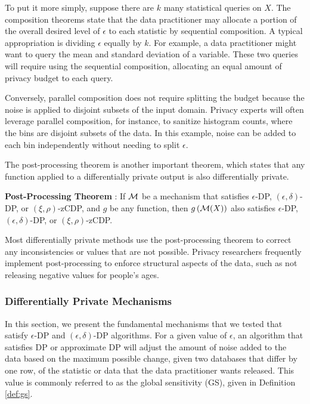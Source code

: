 To put it more simply, suppose there are $k$ many statistical queries on $X$. The composition theorems state that the data practitioner may allocate a portion of the overall desired level of $\epsilon$ to each statistic by sequential composition. A typical appropriation is dividing $\epsilon$ equally by $k$. For example, a data practitioner might want to query the mean and standard deviation of a variable. These two queries will require using the sequential composition, allocating an equal amount of privacy budget to each query.

Conversely, parallel composition does not require splitting the budget because the noise is applied to disjoint subsets of the input domain. Privacy experts will often leverage parallel composition, for instance, to sanitize histogram counts, where the bins are disjoint subsets of the data. In this example, noise can be added to each bin independently without needing to split $\epsilon$.

The post-processing theorem is another important theorem, which states that any function applied to a differentially private output is also differentially private.

\begin{thm}\label{thm:post} \textbf{Post-Processing Theorem} \autocite{dwork2006calibrating,nissim2007smooth, bun2016concentrated}:
If $\mathcal{M}$ be a mechanism that satisfies $\epsilon$-DP, $(\epsilon,\delta)$-DP, or $(\xi,\rho)$-zCDP, and $g$ be any function, then $g\left(\mathcal{M}(X)\right)$ also satisfies $\epsilon$-DP, $(\epsilon,\delta)$-DP, or $(\xi,\rho)$-zCDP.
\end{thm}

Most differentially private methods use the post-processing theorem to correct any inconsistencies or values that are not possible. Privacy researchers frequently implement post-processing to enforce structural aspects of the data, such as not releasing negative values for people's ages.

\subsubsection{Differentially Private Mechanisms}\label{subsec:mech}
In this section, we present the fundamental mechanisms that we tested that satisfy $\epsilon$-DP and $(\epsilon, \delta)$-DP algorithms. For a given value of $\epsilon$, an algorithm that satisfies DP or approximate DP will adjust the amount of noise added to the data based on the maximum possible change, given two databases that differ by one row, of the statistic or data that the data practitioner wants released. This value is commonly referred to as the global sensitivity (GS), given in Definition \ref{def:gs}.

